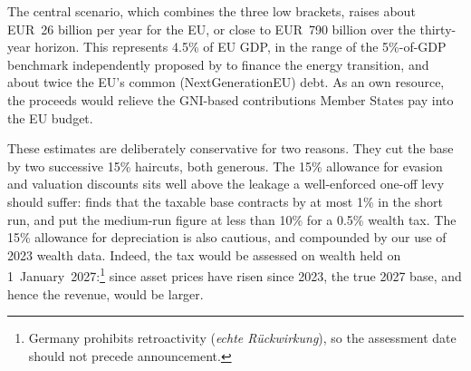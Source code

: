 \documentclass[../../main]{subfiles}
\begin{document}
The central scenario, which combines the three low brackets, raises about EUR~26 billion per year for the EU, or close to EUR~790 billion over the thirty-year horizon. This represents 4.5\% of EU GDP,
in the range of the 5\%-of-GDP benchmark independently proposed by \citet{PisaniFerryMahfouz2023} to finance the energy transition, %
and about twice %
the EU's common (NextGenerationEU) debt. %
As an own resource, the proceeds would relieve the GNI-based contributions Member States pay into the EU budget. %

These estimates are deliberately conservative for two reasons. They cut the base by two successive 15\% haircuts, both generous. The 15\% allowance for evasion and valuation discounts sits well above the leakage a well-enforced one-off levy should suffer: \citet{Seim2017} finds that the taxable base contracts by at most 1\% in the short run, and \citet{AdvaniTarrant2021} put the medium-run figure at less than 10\% for a 0.5\% wealth tax. The 15\% allowance for depreciation is also cautious, %
and compounded by our use of 2023 wealth data.
Indeed, the tax would be assessed on wealth held on 1~January~2027:\footnote{Germany prohibits retroactivity (\textit{echte Rückwirkung}), so the assessment date should not precede announcement.} since asset prices have risen since 2023, the true 2027 base, and hence the revenue, would be larger. %
\end{document}
